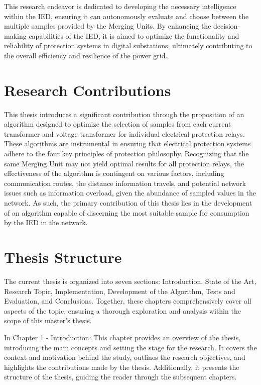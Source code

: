 This research endeavor is dedicated to developing the necessary intelligence within the IED, ensuring it can autonomously evaluate and choose between the multiple samples provided by the Merging Units. By enhancing the decision-making capabilities of the IED, it is aimed to optimize the functionality and reliability of protection systems in digital substations, ultimately contributing to the overall efficiency and resilience of the power grid.

\section{Research Contributions}
This thesis introduces a significant contribution through the proposition of an algorithm designed to optimize the selection of samples from each current transformer and voltage transformer for individual electrical protection relays. These algorithms are instrumental in ensuring that electrical protection systems adhere to the four key principles of protection philosophy. Recognizing that the same Merging Unit may not yield optimal results for all protection relays, the effectiveness of the algorithm is contingent on various factors, including communication routes, the distance information travels, and potential network issues such as information overload, given the abundance of sampled values in the network. As such, the primary contribution of this thesis lies in the development of an algorithm capable of discerning the most suitable sample for consumption by the IED in the network.

\section{Thesis Structure}

The current thesis is organized into seven sections: Introduction, State of the Art, Research Topic, Implementation, Development of the Algorithm, Tests and Evaluation, and Conclusions. Together, these chapters comprehensively cover all aspects of the topic, ensuring a thorough exploration and analysis within the scope of this master's thesis.

In Chapter 1 - Introduction: This chapter provides an overview of the thesis, introducing the main concepts and setting the stage for the research. It covers the context and motivation behind the study, outlines the research objectives, and highlights the contributions made by the thesis. Additionally, it presents the structure of the thesis, guiding the reader through the subsequent chapters.

